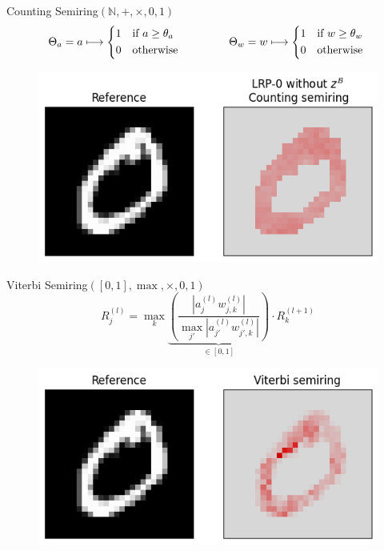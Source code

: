 \documentclass[aspectratio=169]{beamer}
\theoremstyle{definition}
\begin{document}
\begin{frame}{Counting Semiring}{\large $(\mathbb{N}, +, \times, 0, 1)$}
    \begin{equation*}
        \Theta_a = a \longmapsto \begin{cases*}
            1 & if $a\geq\theta_a$\\
            0 & otherwise
        \end{cases*}
        \qquad\qquad
        \Theta_w = w \longmapsto \begin{cases*}
            1 & if $w\geq\theta_w$\\
            0 & otherwise
        \end{cases*}
    \end{equation*}

    \begin{figure}[H]
        \centering
        \includegraphics[width=.5\textwidth]{counting.png}
    \end{figure}
\end{frame}

\begin{frame}{Viterbi Semiring}{\large $([0, 1], \max, \times, 0, 1)$}
    \begin{equation*}
        R^{(l)}_j = \max_k \underbrace{\left(\frac{\left|a^{(l)}_jw_{j, k}^{(l)}\right|}{\max_{j'} \left|a^{(l)}_{j'}w_{j', k}^{(l)}\right|}\right)}_{\in[0, 1]} \cdot R^{(l+1)}_k
    \end{equation*}

    \begin{figure}[H]
        \centering
        \includegraphics[width=.5\textwidth]{viterbi.png}
    \end{figure}
\end{frame}
\end{document}
